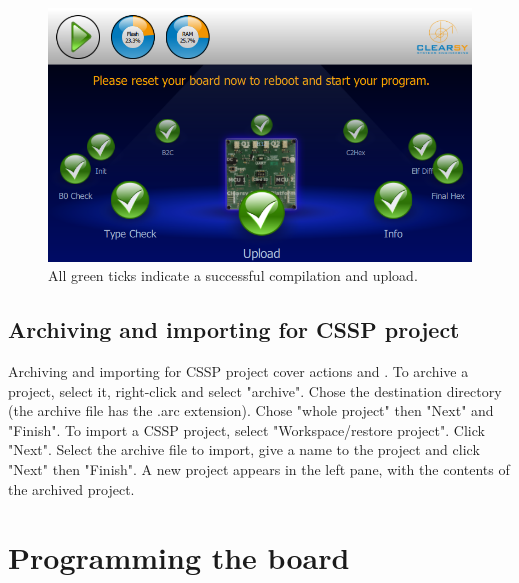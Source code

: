       \begin{figure}[h]
\centering\includegraphics[scale=0.3]{Pictures/chapterProgramming/runner-upload-completed.png}
\caption{All green ticks indicate a successful compilation and upload.}
\label{programming:runner-upload-completed}
\end{figure}  

\subsection{Archiving and importing for CSSP project}

Archiving and importing for CSSP project cover actions  and . To archive a project, select it, right-click and select "archive". Chose the destination directory (the archive file has the .arc extension). Chose "whole project" then "Next" and "Finish".
To import a CSSP project, select "Workspace/restore project". Click "Next". Select the archive file to import, give a name to the project and click "Next" then "Finish". A new project appears in the left pane, with the contents of the archived project.

\section{Programming the board}

